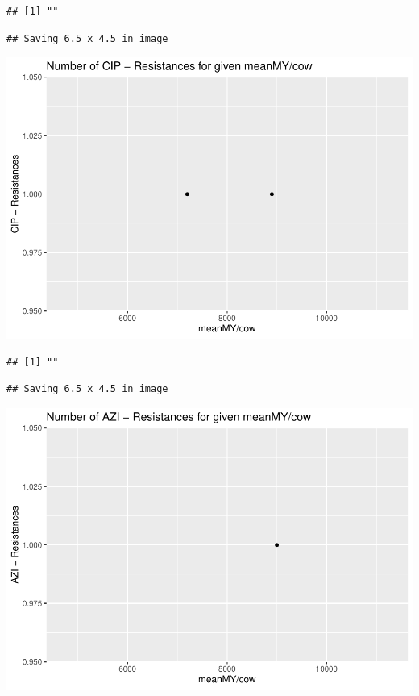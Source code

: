 \documentclass[
]{article}
\begin{document}
\begin{verbatim}
## [1] ""
\end{verbatim}

\begin{verbatim}
## Saving 6.5 x 4.5 in image
\end{verbatim}

\includegraphics{NResistenzen_files/figure-latex/numerical_variables-2.pdf}

\begin{verbatim}
## [1] ""
\end{verbatim}

\begin{verbatim}
## Saving 6.5 x 4.5 in image
\end{verbatim}

\includegraphics{NResistenzen_files/figure-latex/numerical_variables-3.pdf}
\end{document}
